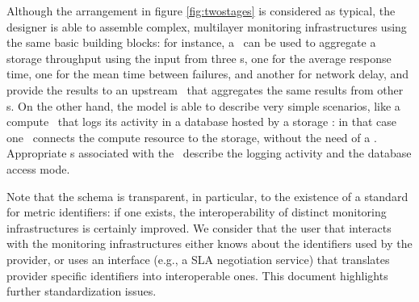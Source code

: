 \documentclass[12pt]{article}  %
\begin{document}
Although the arrangement in figure \ref{fig:twostages} is considered as typical, the designer is able to assemble complex, multilayer monitoring infrastructures using the same basic building blocks: for instance, a \sens\ can be used to aggregate a storage throughput using the input from three \coll s, one for the average response time, one for the mean time between failures, and another for network delay, and provide the results to an upstream \sens\ that aggregates the same results from other \sens s. On the other hand, the model is able to describe very simple scenarios, like a compute \rs\ that logs its activity in a database hosted by a storage \rs: in that case one \coll\ connects the compute resource to the storage, without the need of a \sens. Appropriate \mi s associated with the \coll\ describe the logging activity and the database access mode.

Note that the schema is transparent, in particular, to the existence of a standard for metric identifiers: if one exists, the interoperability of distinct monitoring infrastructures is certainly improved. We consider that the user that interacts with the monitoring infrastructures either knows about the identifiers used by the provider, or uses an interface (e.g., a SLA negotiation service) that translates provider specific identifiers into interoperable ones. This document highlights further standardization issues.
\end{document}
